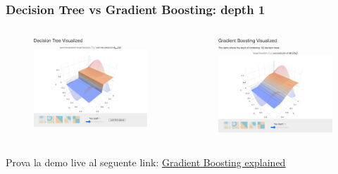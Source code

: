 \begin{frame}
	
	\frametitle{Decision Tree vs Gradient Boosting: depth 1}

	\begin{columns}
		\begin{figure}[!htbp]
			\centering
			\includegraphics[width=1.0\linewidth]{images/supervised/z_algorithms_ensemble/decision_tree_depth_1.png}
		\end{figure}
		
		\begin{figure}[!htbp]
			\centering
			\includegraphics[width=0.93\linewidth]{images/supervised/z_algorithms_ensemble/gradient_boosting_depth_1.png}
		\end{figure}
	\end{columns}
	
	\begin{center}
		Prova la demo live al seguente link: \underline{\href{http://arogozhnikov.github.io/2016/06/24/gradient_boosting_explained.html}{Gradient Boosting explained}}
	\end{center}
	
\end{frame}


